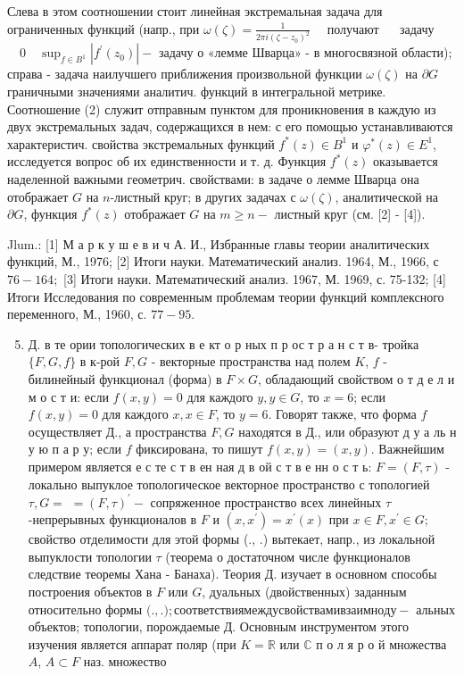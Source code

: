 \documentclass[10pt]{article}
\begin{document}
Слева в этом соотношении стоит линейная экстремальная задача для ограниченных функций (напр., при $\omega(\zeta)=\frac{1}{2 \pi i\left(\zeta-z_{0}\right)^{2}} \quad$ получают $\quad$ задачу $\quad 0 \quad \sup _{f \in B^{1}}\left|f^{\prime}\left(z_{0}\right)\right|-$ задачу о «лемме Шварца» - в многосвязной области); справа - задача наилучшего приближения произвольной функции $\omega(\zeta)$ на $\partial G$ граничными значениями аналитич. функций в интегральной метрике. Соотношение (2) служит отправным пунктом для проникновения в каждую из двух экстремальных задач, содержащихся в нем: с его помощью устанавливаются характеристич. свойства экстремальных функций $f^{*}(z) \in B^{1}$ и $\varphi^{*}(z) \in E^{1}$, исследуется вопрос об их единственности и т. д. Функция $f^{*}(z)$ оказывается наделенной важными геометрич. свойствами: в задаче о лемме Шварца она отображает $G$ на $n$-листный круг; в других задачах с $\omega(\zeta)$, аналитической на $\partial G$, функция $f^{*}(z)$ отображает $G$ на $m \geqslant n-$ листный круг (см. [2] - [4]).



Jlum.: [1] М а р к у ш е в и ч А. И., Избранные главы теории аналитических функций, М., 1976; [2] Итоги науки. Математический анализ. 1964, М., 1966, с $76-164 ;$ [3] Итоги науки. Математический анализ. 1967, М. 1969, с. 75-132; [4] Итоги Исследования по современным проблемам теории функций комплексного переменного, М., 1960, с. $77-95$.



\begin{enumerate}

  \setcounter{enumi}{4}

  \item Д. в те ории топологических в е кт о р ных п р ос т р а н с т в- тройка $\{F, G, f\}$ в к-рой $F, G$ - векторные пространства над полем $K$, $f$ - билинейный функционал (форма) в $F \times G$, обладающий свойством о т д е л и м о с т и: если $f(x, y)=0$ для каждого $y, y \in G$, то $x=6$; если $f(x, y)=0$ для каждого $x, x \in F$, то $y=6$. Говорят также, что форма $f$ осуществляет Д., а пространства $F, G$ находятся в Д., или образуют д у а ль н у ю п а р у; если $f$ фиксирована, то пишут $f(x, y)=(x, y)$. Важнейшим примером является е с те с т в ен ная д в ой с т в е нн о с т ь: $F=(F, \tau)$ - локально выпуклое топологическое векторное пространство с топологией $\tau, G=$ $=(F, \tau)^{\prime}-$ сопряженное пространство всех линейных $\tau$-непрерывных функционалов в $F$ и $\left(x, x^{\prime}\right)=x^{\prime}(x)$ при $x \in F, x^{\prime} \in G ;$ свойство отделимости для этой формы (., .) вытекает, напр., из локальной выпуклости топологии $\tau$ (теорема о достаточном числе функционалов следствие теоремы Хана - Банаха). Теория Д. изучает в основном способы построения объектов в $F$ или $G$, дуальных (двойственных) заданным относительно формы $(.,$.$) ; соответствия между свойствами взаимно ду-$ альных объектов; топологии, порождаемые Д. Основным инструментом этого изучения является аппарат поляр (при $K=\mathbb{R}$ или $\mathbb{C}$ п о л я р о й множества $A$, $A \subset F$ наз. множество

\end{enumerate}
\end{document}
